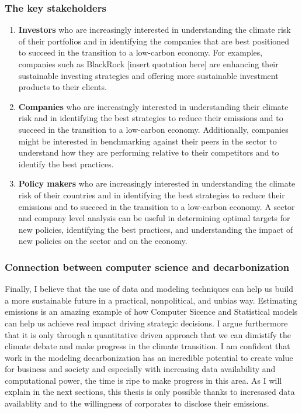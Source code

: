  \subsubsection{The key stakeholders}
 \begin{enumerate}
    \item \textbf{Investors} who are increasingly interested in understanding the climate risk of their portfolios and in identifying the companies that are best positioned to succeed in the transition to a low-carbon economy. For examples, companies such as BlackRock [insert quotation here] are enhancing their sustainable investing strategies and offering more sustainable investment products to their clients.
    \item \textbf{Companies} who are increasingly interested in understanding their climate risk and in identifying the best strategies to reduce their emissions and to succeed in the transition to a low-carbon economy. Additionally, companies might be interested in benchmarking against their peers in the sector to understand how they are performing relative to their competitors and to identify the best practices. 
    \item \textbf{Policy makers} who are increasingly interested in understanding the climate risk of their countries and in identifying the best strategies to reduce their emissions and to succeed in the transition to a low-carbon economy. A sector and company level analysis can be useful in determining optimal targets for new policies, identifying the best practices, and understanding the impact of new policies on the sector and on the economy.
\end{enumerate}

\subsubsection{Connection between computer science and decarbonization}
\noindent Finally, I believe that the use of data and modeling techniques  can help us build a more sustainable future in a practical, nonpolitical, and unbias way. Estimating emissions is an amazing example of how Computer Sicence and Statistical models can help us achieve real impact driving strategic decisions. I argue furthermore that it is only through a quantitative driven approach that we can dimistify the climate debate and make progress in the climate transition. I am confident that work in the modeling decarbonization has an incredible potential to create value for business and society and especially with increasing data availability and computational power, the time is ripe to make progress in this area. As I will explain in the next sections, this thesis is only possible thanks to incresased data availablity and to the willingness of corporates to disclose their emissions.


